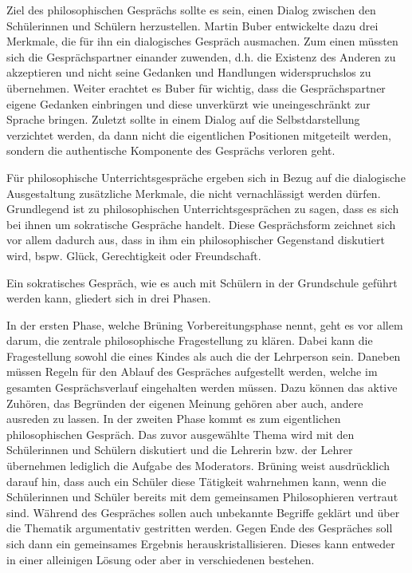 Ziel des philosophischen Gesprächs sollte es sein, einen Dialog zwischen den Schülerinnen und Schülern herzustellen. 
Martin Buber entwickelte dazu drei Merkmale, die für ihn ein dialogisches Gespräch ausmachen. 
Zum einen müssten sich die Gesprächspartner einander zuwenden, d.h. die Existenz des Anderen zu akzeptieren und nicht seine Gedanken und Handlungen widerspruchslos zu übernehmen\cite[S.\,106]{MB15}.
Weiter erachtet es Buber für wichtig, dass die Gesprächspartner eigene Gedanken einbringen und diese unverkürzt wie uneingeschränkt zur Sprache bringen. 
Zuletzt sollte in einem Dialog auf die Selbstdarstellung verzichtet werden, da dann nicht die eigentlichen Positionen mitgeteilt werden, sondern die authentische Komponente des Gesprächs verloren geht.

Für philosophische Unterrichtsgespräche ergeben sich in Bezug auf die dialogische Ausgestaltung zusätzliche Merkmale, die nicht vernachlässigt werden dürfen. 
Grundlegend ist zu philosophischen Unterrichtsgesprächen zu sagen, dass es sich bei ihnen um sokratische Gespräche handelt. 
Diese Gesprächsform zeichnet sich vor allem dadurch aus, \glqq dass in ihm ein philosophischer Gegenstand diskutiert wird, bspw. Glück, Gerechtigkeit oder Freundschaft.\grqq{}\cite[S.\,27]{BB10}

Ein sokratisches Gespräch, wie es auch mit Schülern in der Grundschule geführt werden kann, gliedert sich in drei Phasen. 

In der ersten Phase, welche Brüning Vorbereitungsphase nennt, geht es vor allem darum, die zentrale philosophische Fragestellung zu klären. 
Dabei kann die Fragestellung sowohl die eines Kindes als auch die der Lehrperson sein. 
Daneben müssen Regeln für den Ablauf des Gespräches aufgestellt werden, welche im gesamten Gesprächsverlauf eingehalten werden müssen. 
Dazu können das aktive Zuhören, das Begründen der eigenen Meinung gehören aber auch, andere ausreden zu lassen\cite[S.\,31]{BB10}.
In der zweiten Phase kommt es zum eigentlichen philosophischen Gespräch. 
Das zuvor ausgewählte Thema wird mit den Schülerinnen und Schülern diskutiert und die Lehrerin bzw. der Lehrer übernehmen lediglich die Aufgabe des Moderators. 
Brüning weist ausdrücklich darauf hin, dass auch ein Schüler diese Tätigkeit wahrnehmen kann, wenn die Schülerinnen und Schüler bereits mit dem gemeinsamen Philosophieren vertraut sind. 
Während des Gespräches sollen auch unbekannte Begriffe geklärt und über die Thematik argumentativ gestritten werden. 
Gegen Ende des Gespräches soll sich dann ein gemeinsames Ergebnis herauskristallisieren. 
Dieses kann entweder in einer alleinigen Lösung oder aber in verschiedenen bestehen. 

